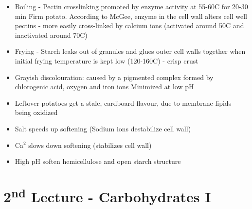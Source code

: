 \begin{highlight}
    \begin{itemize}
        \item Boiling - Pectin crosslinking promoted by enzyme activity at 55-60\textdegree C for 20-30 min
        \subitem Firm potato. According to McGee, enzyme in the cell wall alters cell well pectins - more easily cross-linked by calcium ions (activated around 50\textdegree C and inactivated around 70\textdegree C)
        \item Frying - Starch leaks out of granules and glues outer cell walls together when initial frying temperature is kept low (120-160\textdegree C) - crisp crust
        \item Grayish discolouration: caused by a pigmented complex formed by chlorogenic acid, oxygen and iron ions
        \subitem Minimized at low pH
        \item Leftover potatoes get a stale, cardboard flavour, due to membrane lipids being oxidized
        \item Salt speeds up softening (Sodium ions destabilize cell wall)
        \item Ca$^2$ slows down softening (stabilizes cell wall)
        \item High pH soften hemicellulose and open starch structure
    \end{itemize}
\end{highlight}

\section*{2\texorpdfstring{\textsuperscript{nd}}{nd} Lecture - Carbohydrates I}
